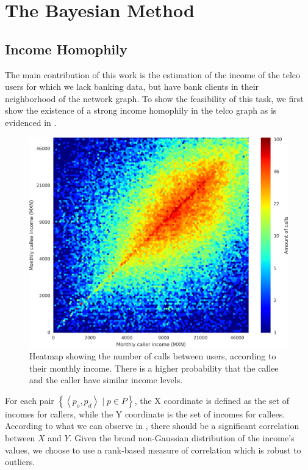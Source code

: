 \chapter{The Bayesian Method}
\label{sec:inference_methodology}

\section{Income Homophily}
\label{subsec:income_homophily}

The main contribution of this work is the estimation of the income of the telco users for which we lack banking data, but have bank clients in their neighborhood of the network graph. To show the feasibility of this task, we first show the existence of a strong income homophily in the telco graph as is evidenced in .

\begin{figure}
\centering
\includegraphics[width=\columnwidth]{figures/Homophily_income_origin_target_1/Homophily_income_origin_target_1.png}
\caption{Heatmap showing the number of calls between users, according to their monthly income. There is a higher probability that the callee and the caller have similar income levels.}
\label{fig:homophily_heatmap}
\end{figure}

For each pair $\left\{ \left< p_o, p_d \right> \mid p \in P \right\}$, the X coordinate is defined as the set of incomes for callers, while the Y coordinate is the set of incomes for callees. According to what we can observe in , there should be a significant correlation between $X$ and $Y$. Given the broad non-Gaussian distribution of the income's values, we choose to use a rank-based measure of correlation which is robust to outliers.

